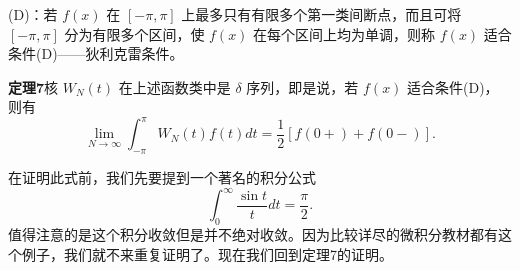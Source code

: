 (D)：若 $f(x)$ 在 $[-\pi,\pi]$ 上最多只有有限多个第一类间断点，而且可将 $[-\pi,\pi]$ 分为有限多个区间，使 $f(x)$ 在每个区间上均为单调，则称 $f(x)$ 适合条件(D)——狄利克雷条件。

\noindent\textbf{定理7}\quad 核 $W_N(t)$ 在上述函数类中是 $\delta$ 序列，即是说，若 $f(x)$ 适合条件(D)，则有
\begin{equation}
 \lim_{N\to\infty}\int_{-\pi}^{\pi}W_N(t)f(t)dt
 =\frac12[f(0+)+f(0-)].
 \tag{28}
\end{equation}

在证明此式前，我们先要提到一个著名的积分公式
\[
 \int_0^{\infty}\frac{\sin t}{t}dt=\frac\pi2.
\]
值得注意的是这个积分收敛但是并不绝对收敛。因为比较详尽的微积分教材都有这个例子，我们就不来重复证明了。现在我们回到定理7的证明。

